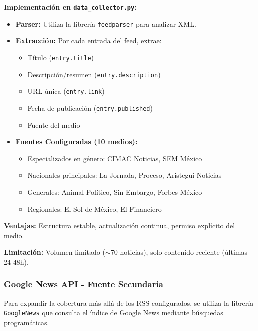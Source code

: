 \textbf{Implementación en \texttt{data\_collector.py}:}
\begin{itemize}
    \item \textbf{Parser:} Utiliza la librería \texttt{feedparser} para analizar XML.
    \item \textbf{Extracción:} Por cada entrada del feed, extrae:
    \begin{itemize}
        \item Título (\texttt{entry.title})
        \item Descripción/resumen (\texttt{entry.description})
        \item URL única (\texttt{entry.link})
        \item Fecha de publicación (\texttt{entry.published})
        \item Fuente del medio
    \end{itemize}
    \item \textbf{Fuentes Configuradas (10 medios):}
    \begin{itemize}
        \item Especializados en género: CIMAC Noticias, SEM México
        \item Nacionales principales: La Jornada, Proceso, Aristegui Noticias
        \item Generales: Animal Político, Sin Embargo, Forbes México
        \item Regionales: El Sol de México, El Financiero
    \end{itemize}
\end{itemize}

\textbf{Ventajas:} Estructura estable, actualización continua, permiso explícito del medio.

\textbf{Limitación:} Volumen limitado ($\sim$70 noticias), solo contenido reciente (últimas 24-48h).

\subsubsection{Google News API - Fuente Secundaria}
\label{subsubsec:google_news}

Para expandir la cobertura más allá de los RSS configurados, se utiliza la librería \texttt{GoogleNews} que consulta el índice de Google News mediante búsquedas programáticas.

